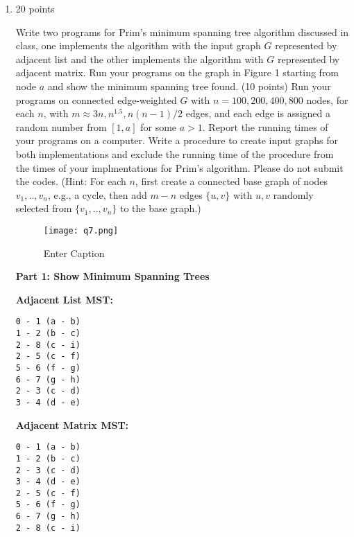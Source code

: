\documentclass[letterpaper,12pt]{article}
\begin{document}
\begin{enumerate}
\noindent\rule{16cm}{0.1pt}
\item 20 points 

Write two programs for Prim's minimum spanning tree algorithm discussed in class,
one implements the algorithm with the input graph $G$ represented by adjacent list
and the other implements the algorithm with $G$ represented by adjacent matrix. Run
your programs on the graph in Figure 1 starting from node $a$ and show
the minimum spanning tree found. (10 points) Run your programs on connected edge-weighted 
$G$ with $n=100,200,400,800$ nodes, for each $n$, with $m\approx 3n,n^{1.5},n(n-1)/2$ 
edges, and each edge is assigned a random number from $[1,a]$ for some $a>1$. 
Report the running times of your programs on a computer. Write a procedure to create 
input graphs for both implementations and exclude the running time of the procedure 
from the times of your implmentations for Prim's algorithm. Please do not submit the codes.
(Hint: For each $n$, first create a connected base graph of nodes $v_1,..,v_n$, e.g., a cycle,
then add $m-n$ edges $\{u,v\}$ with $u,v$ randomly selected from $\{v_1,..,v_n\}$ to
the base graph.) 

\begin{figure}
    \centering
    \texttt{[image: q7.png]}
    \caption{Enter Caption}
    \label{fig:enter-label}
\end{figure}

\textbf{Part 1: Show Minimum Spanning Trees}

\textbf{Adjacent List MST:} 
\begin{verbatim}
0 - 1 (a - b)
1 - 2 (b - c)
2 - 8 (c - i)
2 - 5 (c - f)
5 - 6 (f - g)
6 - 7 (g - h)
2 - 3 (c - d)
3 - 4 (d - e)
\end{verbatim}

\textbf{Adjacent Matrix MST:} 
\begin{verbatim}
0 - 1 (a - b)
1 - 2 (b - c)
2 - 3 (c - d)  
3 - 4 (d - e)  
2 - 5 (c - f)  
5 - 6 (f - g) 
6 - 7 (g - h) 
2 - 8 (c - i) 
\end{verbatim}


\end{enumerate}
\end{document}
